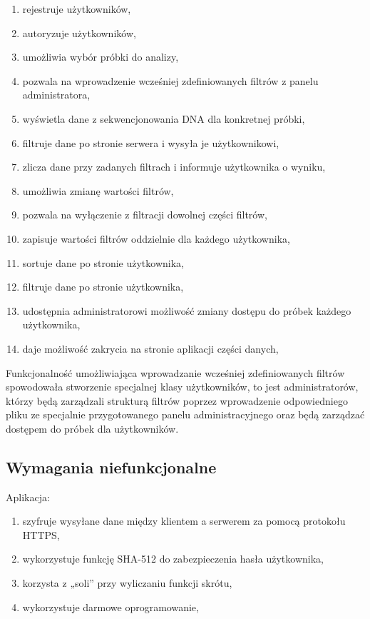 \documentclass[a4paper,12pt,twoside]{article}
\begin{document}
\begin{enumerate}[1)]
\item rejestruje użytkowników,
\item autoryzuje użytkowników,
\item umożliwia wybór próbki do analizy,
\item pozwala na wprowadzenie wcześniej zdefiniowanych filtrów z panelu administratora,
\item wyświetla dane z sekwencjonowania DNA dla konkretnej próbki,
\item filtruje dane po stronie serwera i wysyła je użytkownikowi,
\item zlicza dane przy zadanych filtrach i informuje użytkownika o wyniku,
\item umożliwia zmianę wartości filtrów,
\item pozwala na wyłączenie z filtracji dowolnej części filtrów,
\item zapisuje wartości filtrów oddzielnie dla każdego użytkownika,
\item sortuje dane po stronie użytkownika,
\item filtruje dane po stronie użytkownika,
\item udostępnia administratorowi możliwość zmiany dostępu do próbek
każdego użytkownika,
\item daje możliwość zakrycia na stronie aplikacji części danych,
\end{enumerate}

Funkcjonalność umożliwiająca wprowadzanie wcześniej zdefiniowanych filtrów spowodowała stworzenie
specjalnej klasy użytkowników, to jest administratorów, którzy będą zarządzali strukturą filtrów poprzez wprowadzenie odpowiedniego pliku ze specjalnie przygotowanego panelu administracyjnego
oraz będą zarządzać dostępem do próbek dla użytkowników.

\subsection{Wymagania niefunkcjonalne}
Aplikacja:
\begin{enumerate}[1)]
\item szyfruje wysyłane dane między klientem a serwerem za pomocą protokołu HTTPS,
\item wykorzystuje funkcję SHA-512 \cite{sha} do zabezpieczenia hasła użytkownika,
\item korzysta z „soli” przy wyliczaniu funkcji skrótu,
\item wykorzystuje darmowe oprogramowanie,
\end{enumerate}
\end{document}
